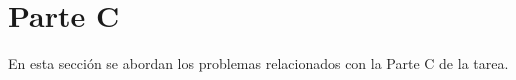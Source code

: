 \section{Parte C}
\label{sec:parteC}

En esta sección se abordan los problemas relacionados con la Parte C de la tarea.

